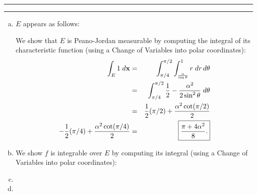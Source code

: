 \documentclass[11pt]{article}
\newcounter{questionCounter}
\newcounter{partCounter}[questionCounter]
\newenvironment{question}[2][\arabic{questionCounter}]{%
    \setcounter{partCounter}{0}%
    \vspace{.25in} \hrule \vspace{0.5em}%
        \noindent{\bf #2}%
    \vspace{0.8em} \hrule \vspace{.10in}%
    \addtocounter{questionCounter}{1}%
}{}
\newcommand{\bx}{\mathbf{x}}
\newcommand{\pjm}{Peano-Jordan measurable }
\begin{document}
\begin{question}{Problem 4}
\begin{enumerate}[(a)]
\item $E$ appears as follows:
\vspace{3cm}

We show that $E$ is \pjm by computing the integral of its characteristic
function (using a Change of Variables into polar coordinates):
\begin{eqnarray*}
\int_E 1 \; d\bx
 & = & \int_{\pi/4}^{\pi/2} \int_{\frac{\alpha}{\sin \theta}}^1 r \; dr \, d\theta \\
 & = & \int_{\pi/4}^{\pi/2} \frac12 - \frac{\alpha^2}{2\sin^2 \theta} \; d\theta \\
 & = & \frac12(\pi/2) + \frac{\alpha^2\cot(\pi/2)}{2} \\
   -   \frac12(\pi/4) + \frac{\alpha^2\cot(\pi/4)}{2}
 & = & \mbox{\fbox{$\displaystyle \frac{\pi + 4\alpha^2}{8}$.}}
\end{eqnarray*}

\item We show $f$ is integrable over $E$ by computing its integral (using a
Change of Variables into polar coordinates):
\vspace{3cm}

\item
\vspace{3cm}

\item
\end{enumerate}
\end{question}
\end{document}
